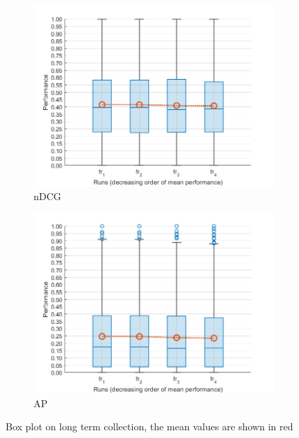\begin{figure}[tbp]
     \centering
     \begin{subfigure}[b]{0.45\textwidth}
         \centering
         \includegraphics[width=\textwidth]{figure/long-ndcg-boxplot.png}
         \caption{\ac{nDCG}}
     \end{subfigure}
     \hfill
     \begin{subfigure}[b]{0.45\textwidth}
         \centering
         \includegraphics[width=\textwidth]{figure/long-map-boxplot.png}
         \caption{\ac{AP}}
     \end{subfigure}
        \caption{Box plot on long term collection, the mean values are shown in red}
        \label{fig:long-boxplot}
\end{figure}

